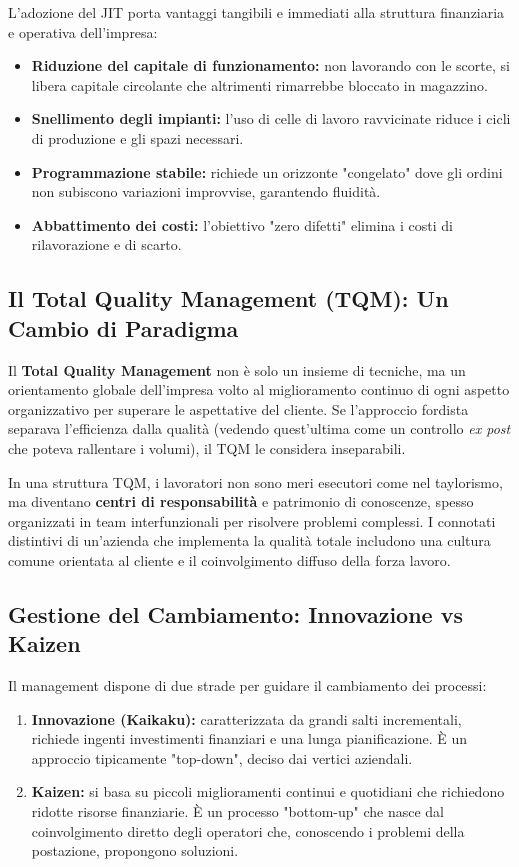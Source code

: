 \documentclass[a4paper,10pt]{article}
\begin{document}
L'adozione del JIT porta vantaggi tangibili e immediati alla struttura finanziaria e operativa dell'impresa:
\begin{itemize}
    \item \textbf{Riduzione del capitale di funzionamento:} non lavorando con le scorte, si libera capitale circolante che altrimenti rimarrebbe bloccato in magazzino.
    \item \textbf{Snellimento degli impianti:} l'uso di celle di lavoro ravvicinate riduce i cicli di produzione e gli spazi necessari.
    \item \textbf{Programmazione stabile:} richiede un orizzonte "congelato" dove gli ordini non subiscono variazioni improvvise, garantendo fluidità.
    \item \textbf{Abbattimento dei costi:} l'obiettivo "zero difetti" elimina i costi di rilavorazione e di scarto.
\end{itemize}

\subsection*{Il Total Quality Management (TQM): Un Cambio di Paradigma}

Il \textbf{Total Quality Management} non è solo un insieme di tecniche, ma un orientamento globale dell'impresa volto al miglioramento continuo di ogni aspetto organizzativo per superare le aspettative del cliente. Se l'approccio fordista separava l'efficienza dalla qualità (vedendo quest'ultima come un controllo \textit{ex post} che poteva rallentare i volumi), il TQM le considera inseparabili.

In una struttura TQM, i lavoratori non sono meri esecutori come nel taylorismo, ma diventano \textbf{centri di responsabilità} e patrimonio di conoscenze, spesso organizzati in team interfunzionali per risolvere problemi complessi. I connotati distintivi di un'azienda che implementa la qualità totale includono una cultura comune orientata al cliente e il coinvolgimento diffuso della forza lavoro.

\subsection*{Gestione del Cambiamento: Innovazione vs Kaizen}

Il management dispone di due strade per guidare il cambiamento dei processi:
\begin{enumerate}
    \item \textbf{Innovazione (Kaikaku):} caratterizzata da grandi salti incrementali, richiede ingenti investimenti finanziari e una lunga pianificazione. È un approccio tipicamente "top-down", deciso dai vertici aziendali.
    \item \textbf{Kaizen:} si basa su piccoli miglioramenti continui e quotidiani che richiedono ridotte risorse finanziarie. È un processo "bottom-up" che nasce dal coinvolgimento diretto degli operatori che, conoscendo i problemi della postazione, propongono soluzioni.
\end{enumerate}
\end{document}
